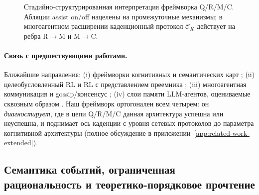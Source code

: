 \documentclass{article}
\begin{document}
\begin{figure}[t]
  \centering
  \caption{Стадийно-структурированная интерпретация фреймворка Q/R/M/C. Абляции assist on/off нацелены на промежуточные механизмы; в многоагентном расширении каденционный протокол $\mathcal{C}_K$ действует на ребра R$\to$M и M$\to$C.}
  \label{fig:causal}
\end{figure}

\paragraph{Связь с предшествующими работами.} Ближайшие направления: (i) фреймворки когнитивных и семантических карт \citep{tolman1948cognitive,okeefe1978hippocampus,kuipers2000spatial,gupta2017cognitive,savinov2018semi}; (ii) целеобусловленный RL и RL с представлением преемника \citep{andrychowicz2017hindsight,ghosh2021learning,dayan1993improving,stachenfeld2017hippocampus,momennejad2017successor}; (iii) многоагентная коммуникация \citep{lowe2017maddpg,foerster2018ctde,sukhbaatar2016commnet,foerster2016learning} и gossip/консенсус \citep{boyd2006gossip,xiao2007distributed}; (iv) слои памяти LLM-агентов, оцениваемые сквозным образом \citep{wang2023voyager,shinn2023reflexion,packer2023memgpt}. Наш фреймворк ортогонален всем четырем: он \emph{диагностирует}, где в цепи Q/R/M/C данная архитектура успешна или неуспешна, и поднимает ось каденции с уровня сетевых протоколов до параметра когнитивной архитектуры (полное обсуждение в приложении~\ref{app:related-work-extended}).

\subsection{Семантика событий, ограниченная рациональность и теоретико-порядковое прочтение}
\label{sec:event-semantics}
\end{document}
